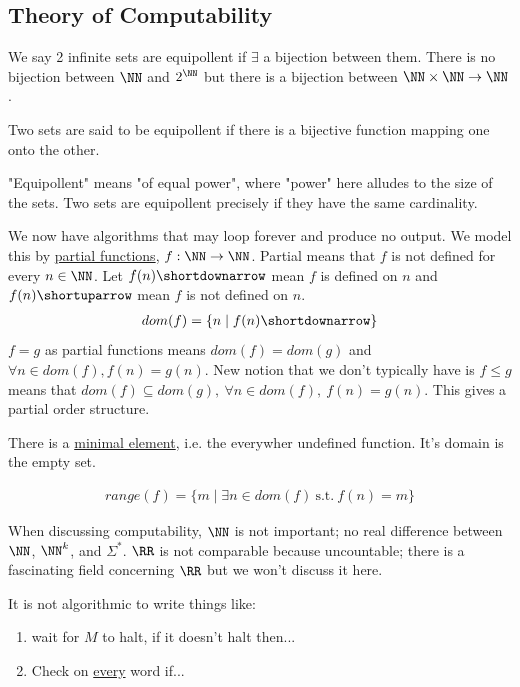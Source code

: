 \documentclass[../598comp.tex]{subfiles}
\begin{document}
\subsection{Theory of Computability}

We say 2 infinite sets are equipollent if $\exists$ a bijection between them.
There is no bijection between $\NN$ and $2^\NN$ but there is a bijection between
$\NN \times \NN \to \NN$.

\begin{definition}[Equipollent]
  Two sets are said to be equipollent if there is a bijective function mapping one onto the other.

  "Equipollent" means "of equal power", where "power" here alludes to the size of the sets. Two sets are equipollent precisely if they have the same cardinality.
\end{definition}

We now have algorithms that may loop forever and produce no output. We model
this by \ul{partial functions}, $f: \NN \to \NN$. Partial means that $f$ is not
defined for every $n \in \NN$. Let $f(n) \shortdownarrow$ mean $f$ is defined on
$n$ and $f(n) \shortuparrow$ mean $f$ is not defined on $n$.
\begin{gather*}
  dom(f) = \{n \mid f(n)\shortdownarrow\}
\end{gather*}
$f = g$ as partial functions means $dom(f) = dom(g)$ and $\forall n \in dom(f),
f(n) = g(n)$. New notion that we don't typically have is $f \leq g$ means that
$dom(f) \subseteq dom(g), \ \forall n \in dom(f), \ f(n) = g(n)$. This gives a
partial order structure.

There is a \ul{minimal element}, i.e. the everywher undefined function. It's
domain is the empty set.

\begin{gather*}
  range(f) = \{m \mid \exists n \in dom(f) \ \text{s.t.} \ f(n) = m\}
\end{gather*}

When discussing computability, $\NN$ is not important; no real difference
between $\NN$, $\NN^k$, and $\Sigma^*$. $\RR$ is not comparable because
uncountable; there is a fascinating field concerning $\RR$ but we won't discuss
it here.

\begin{note}
  It is not algorithmic to write things like:
  \begin{enumerate}
  \item 
    wait for $M$ to halt, if it doesn't halt then...
  \item
    Check on \ul{every} word if...
  \end{enumerate}
\end{note}
\end{document}
